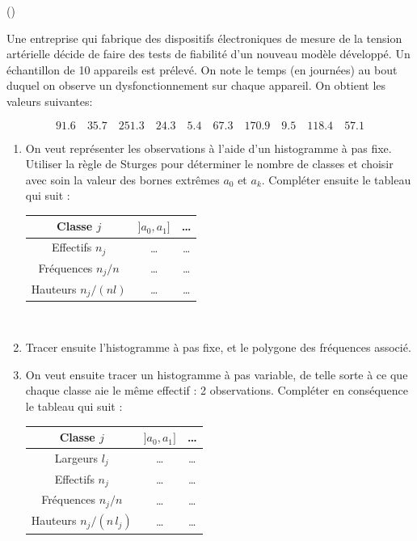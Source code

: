 \begin{exercice}\label{exo1-2} (\minsyndical)

Une entreprise qui fabrique des %
dispositifs \'electroniques de mesure de la tension art\'erielle
d\'ecide de faire des tests de fiabilit\'e d'un nouveau mod\`ele d\'evelopp\'e. 
Un \'echantillon de 10 %
appareils est pr\'elev\'e. %
On note le temps (en journ\'ees) 
au bout duquel on observe un dysfonctionnement sur chaque appareil. 
On obtient les valeurs suivantes:

\[
91.6 \quad 35.7 \quad 251.3 \quad 24.3 \quad 5.4 \quad 67.3 \quad 170.9 \quad 9.5 
\quad 118.4 \quad 57.1
\]

\begin{enumerate}

\item On veut repr\'esenter les observations \`a l'aide d'un histogramme \`a pas fixe. Utiliser la r\`egle de Sturges pour d\'eterminer le nombre de classes et choisir avec soin la valeur des bornes extr\^emes $a_0$ et $a_k$. Compl\'eter ensuite le tableau qui suit :\\

\begin{tabular}{|c|cc}
\hline
Classe $j$ & $] a_0 , a_1 ]$ & \ldots \\ \hline
Effectifs $n_j$ & \ldots & \ldots \\ \hline
Fr\'equences $n_j/n$ & \ldots & \ldots \\ \hline
Hauteurs $n_j/(nl)$ & \ldots & \ldots \\ \hline 
\end{tabular}\\

\item Tracer ensuite l'histogramme \`a pas fixe, et le polygone des fr\'equences associ\'e.

\item On veut ensuite tracer un histogramme \`a pas variable, de telle sorte \`a ce que chaque
classe aie le m\^eme effectif : 2 observations. Compl\'eter en cons\'equence le tableau qui suit :\\

\begin{tabular}{|c|cc}
\hline
Classe $j$ & $] a_0 , a_1 ]$ & \ldots \\ \hline
Largeurs $l_j$ & \ldots & \ldots \\ \hline 
Effectifs $n_j$ & \ldots & \ldots \\ \hline
Fr\'equences $n_j/n$ & \ldots & \ldots \\ \hline
Hauteurs $n_j/(n\,l_j)$ & \ldots & \ldots \\ \hline 
\end{tabular}\\


\end{enumerate}
\end{exercice}
